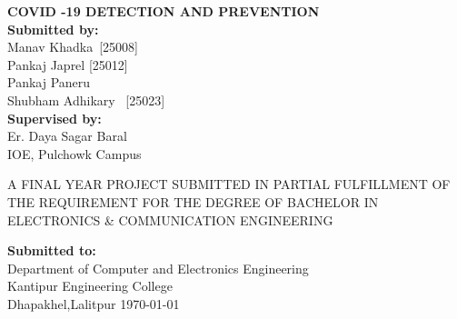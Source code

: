 \documentclass[a4paper,12pt]{report}
\begin{document}
\begin{center}
   \textbf{COVID -19 DETECTION AND PREVENTION}\\
   
   \vfill
  \textbf{Submitted by:}\\
 Manav Khadka\quad \quad \quad\quad\quad\,\,\,[25008]\\
 Pankaj Japrel\quad \quad\quad\quad\qquad\,\,[25012]\\
 Pankaj Paneru\quad\quad\quad \quad\quad\quad[25013]\\
 Shubham Adhikary \quad \quad\quad\,\,\,[25023]\\
 \vfill
 \textbf{Supervised by:}\\
 Er. Daya Sagar Baral\\
 IOE, Pulchowk Campus\\

  
 
  \vfill
  
  A FINAL YEAR PROJECT SUBMITTED IN PARTIAL FULFILLMENT OF THE REQUIREMENT FOR THE DEGREE OF BACHELOR IN ELECTRONICS \& COMMUNICATION ENGINEERING\\
  \vfill
  
  \textbf{Submitted to:}\\
  Department of Computer and Electronics Engineering\\
  Kantipur Engineering College\\
  Dhapakhel,Lalitpur
  \vfill 
   \today
   \thispagestyle{empty} %
  \end{center}
  \pagebreak
\end{document}
